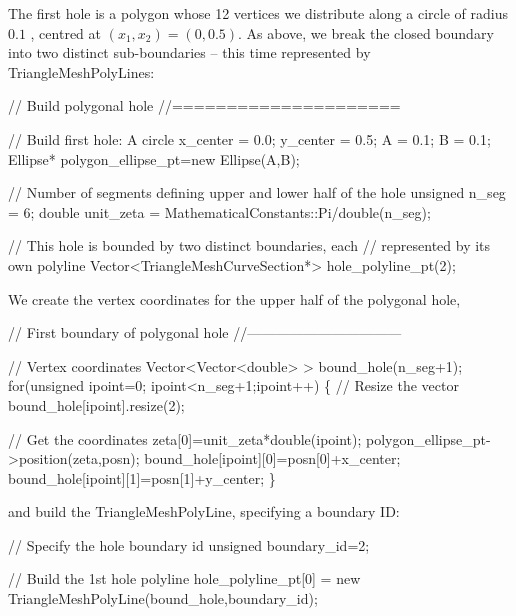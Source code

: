 The first hole is a polygon whose 12 vertices we distribute along a circle of radius $ 0.1 $ , centred at $ (x_1,x_2)=(0,0.5). $ As above, we break the closed boundary into two distinct sub-\/boundaries -- this time represented by {\ttfamily Triangle\+Mesh\+Poly\+Lines\+:} 


\begin{DoxyCodeInclude}

 \textcolor{comment}{// Build polygonal hole}
 \textcolor{comment}{//=====================}
 
 \textcolor{comment}{// Build first hole: A circle}
 x\_center = 0.0;
 y\_center = 0.5;
 A = 0.1;
 B = 0.1;
 Ellipse* polygon\_ellipse\_pt=\textcolor{keyword}{new} Ellipse(A,B);
 
 \textcolor{comment}{// Number of segments defining upper and lower half of the hole}
 \textcolor{keywordtype}{unsigned} n\_seg = 6; 
 \textcolor{keywordtype}{double} unit\_zeta = MathematicalConstants::Pi/double(n\_seg);
 
 \textcolor{comment}{// This hole is bounded by two distinct boundaries, each}
 \textcolor{comment}{// represented by its own polyline}
 Vector<TriangleMeshCurveSection*> hole\_polyline\_pt(2);

\end{DoxyCodeInclude}


We create the vertex coordinates for the upper half of the polygonal hole,


\begin{DoxyCodeInclude}
 

 \textcolor{comment}{// First boundary of polygonal hole}
 \textcolor{comment}{//---------------------------------}

 \textcolor{comment}{// Vertex coordinates}
 Vector<Vector<double> > bound\_hole(n\_seg+1);
 \textcolor{keywordflow}{for}(\textcolor{keywordtype}{unsigned} ipoint=0; ipoint<n\_seg+1;ipoint++)
  \{
   \textcolor{comment}{// Resize the vector }
   bound\_hole[ipoint].resize(2);
   
   \textcolor{comment}{// Get the coordinates}
   zeta[0]=unit\_zeta*double(ipoint);
   polygon\_ellipse\_pt->position(zeta,posn);
   bound\_hole[ipoint][0]=posn[0]+x\_center;
   bound\_hole[ipoint][1]=posn[1]+y\_center;
  \}

\end{DoxyCodeInclude}


and build the {\ttfamily Triangle\+Mesh\+Poly\+Line}, specifying a boundary ID\+:


\begin{DoxyCodeInclude}
 
 \textcolor{comment}{// Specify the hole boundary id}
 \textcolor{keywordtype}{unsigned} boundary\_id=2;
 
 \textcolor{comment}{// Build the 1st hole polyline}
 hole\_polyline\_pt[0] = \textcolor{keyword}{new} TriangleMeshPolyLine(bound\_hole,boundary\_id);

\end{DoxyCodeInclude}



